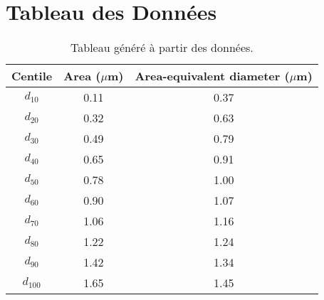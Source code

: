 \documentclass[a4paper]{article}%
\begin{document}
%
\normalsize%
\section{Tableau des Données}%
\label{sec:TableaudesDonnes}%


\begin{table}[h!]%
\caption{Tableau généré à partir des données.}%
\begin{tabular}{|c|c|c|}%
\hline%
Centile&Area ($\mu$m)&Area{-}equivalent diameter ($\mu$m)\\%
\hline%
$d_{10}$&0.11&0.37\\%
$d_{20}$&0.32&0.63\\%
$d_{30}$&0.49&0.79\\%
$d_{40}$&0.65&0.91\\%
$d_{50}$&0.78&1.00\\%
$d_{60}$&0.90&1.07\\%
$d_{70}$&1.06&1.16\\%
$d_{80}$&1.22&1.24\\%
$d_{90}$&1.42&1.34\\%
$d_{100}$&1.65&1.45\\%
\hline%
\end{tabular}%
\end{table}

%
\end{document}
